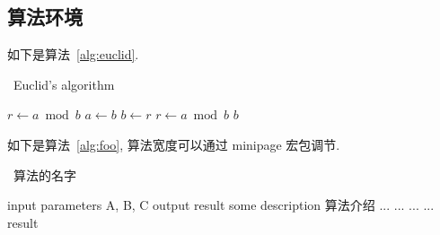 \subsection{算法环境}

如下是算法~\ref{alg:euclid}.
\begin{algorithm}[H]
\small
\caption{~Euclid's algorithm}\label{alg:euclid}
\begin{algorithmic}[1]
  \State $r\gets a\bmod b$
  \State $a\gets b$
  \State $b\gets r$
  \State $r\gets a\bmod b$
  \EndWhile\label{euclidendwhile}
  \State \Return $b$
  \EndProcedure
\end{algorithmic}
\end{algorithm}

如下是算法~\ref{alg:foo}, 算法宽度可以通过 minipage 宏包调节.
\begin{center}
\vspace{-2ex}
\begin{minipage}{.9\linewidth}
\begin{algorithm}[H]
\caption{~算法的名字}\label{alg:foo}
\begin{algorithmic}[1]
\Require input parameters A, B, C
\Ensure output result
\State some description 算法介绍
  \State ...
    \State ...
    \Else
    \State ...
  \EndIf
\EndFor
{}
  \State ...
\EndWhile
\State \Return result
\end{algorithmic}
\end{algorithm}
\end{minipage}
\end{center}

